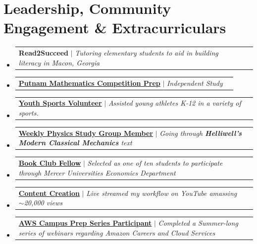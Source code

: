 \documentclass[letterpaper,11.000000001 pt]{article}
\makeatletter
\newcommand{\resumeProjectHeading}[2]{
  \item
  \begin{tabularx}{\linewidth}{@{}Xr@{}}
    \small #1 & \small #2 \\
  \end{tabularx}\vspace{-6pt}
}
\renewcommand{\resumeProjectHeading}[2]{
  \item
  \begin{tabularx}{\linewidth}{@{}>{\raggedright\arraybackslash}X@{\hspace{0.5em}}r@{}}
    \small #1 & \small #2 \\
  \end{tabularx}\vspace{-8pt}
}
\newcommand{\resumeSubHeadingListStart}{\begin{itemize}[leftmargin=0.15in, label={}]}
\newcommand{\resumeSubHeadingListEnd}{\end{itemize}}
\makeatother
\begin{document}
\section{Leadership, Community Engagement \& Extracurriculars}
  \resumeSubHeadingListStart
        \resumeProjectHeading
          {\textbf{Read2Succeed} $|$ \emph{Tutoring elementary students to aid in building literacy in Macon, Georgia}}{}
        \resumeProjectHeading
          {\href{https://maa.org/putnam/}{\textbf{Putnam Mathematics Competition Prep}} $|$ \emph{Independent Study}}{}
        \resumeProjectHeading
          {\href{https://www.lifesportsacademy.net/home}{\textbf{Youth Sports Volunteer}} $|$ \emph{Assisted young athletes K-12 in a variety of sports. }}{}
        \resumeProjectHeading
          {\href{https://www.meetup.com/physicswithfriends/}{\textbf{Weekly Physics Study Group Member}} $|$ \emph{Going through \textbf{Helliwell's Modern Classical Mechanics} text}}{}
        \resumeProjectHeading
          {\textbf{\href{https://csel.mercer.edu/student-engagement/book-clubs/}{Book Club Fellow}} $|$ \emph{Selected as one of ten students to participate through Mercer Universities Economics Department}}{}
        \resumeProjectHeading
          {\textbf{\href{https://www.youtube.com/@AP4Pres}{Content Creation}} $|$ \emph{Live streamed my workflow on YouTube amassing $\sim$20,000 views}}{}
        \resumeProjectHeading
          {\textbf{\href{https://www.gotostage.com/channel/ae3be1897f1e486ebe5a0a0d417396e2/recording/6ecf53ff64484050af20f49c86a9d760/watch}{AWS Campus Prep Series Participant}} $|$ \emph{Completed a Summer-long series of webinars regarding Amazon Careers and Cloud Services}}{}
  \resumeSubHeadingListEnd
  
\vspace{8pt}
\end{document}
